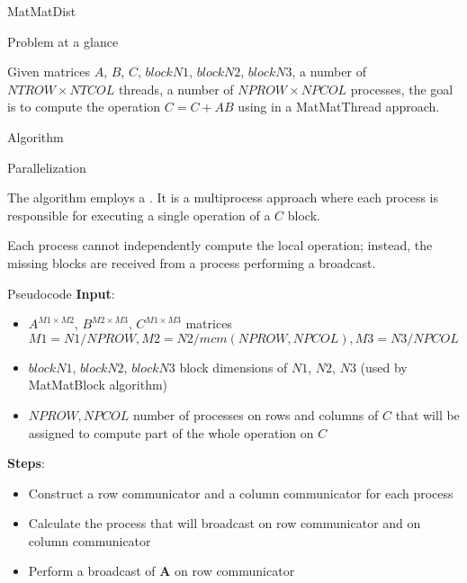 \begin{chapter}{MatMatDist}
    \begin{section}{Problem at a glance}
        \par Given matrices $A$, $B$, $C$, $blockN1$, $blockN2$, $blockN3$, a number of $NTROW \times NTCOL$ threads, a number of $NPROW \times NPCOL$ processes, the goal is to compute the  operation $C = C + AB$ using  in a MatMatThread approach.
    \end{section}
    \begin{section}{Algorithm}
        \begin{subsection}{Parallelization}
            \par The algorithm employs a . It is a multiprocess approach where each process is responsible for executing a single  operation of a $C$ block.
            \par Each process cannot independently compute the local  operation; instead, the missing blocks are received from a process performing a broadcast.
        \end{subsection}
        \begin{subsection}{Pseudocode}
            \textbf{Input}:
            \begin{itemize}
                \item $A^{M1 \times M2}$, $B^{M2 \times M3}$, $C^{M1 \times M3}$ matrices\\
                $M1 = N1 / NPROW, M2 = N2 / mcm(NPROW, NPCOL), M3 = N3 / NPCOL$
                \item $blockN1$, $blockN2$, $blockN3$ block dimensions of $N1$, $N2$, $N3$ (used by MatMatBlock algorithm)
                \item $NPROW, NPCOL$ number of processes on rows and columns of $C$ that will be assigned to compute part of the whole  operation on $C$
            \end{itemize}
            \textbf{Steps}:\\
            \begin{itemize}
                \item Construct a row communicator and a column communicator for each process
                \item Calculate the process that will broadcast on row communicator and on column communicator
                \item Perform a broadcast of $\mathbf{A}$ on row communicator

\end{itemize}
\end{subsection}
\end{section}
\end{chapter}
